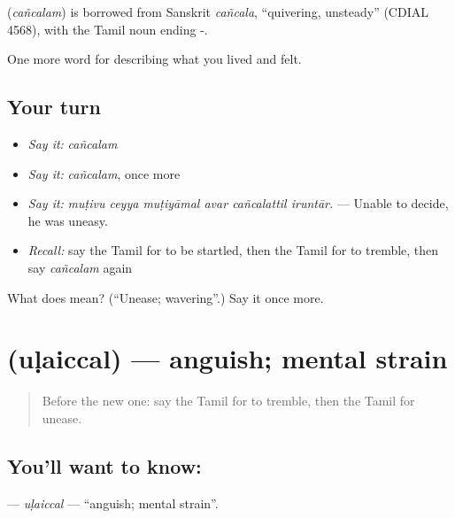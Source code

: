 \begin{cousinweb}
\textbf{} (\emph{cañcalam}) is borrowed from Sanskrit \emph{cañcala}, \textquotedblleft{}quivering, unsteady\textquotedblright{} (CDIAL 4568), with the Tamil noun ending -.
\end{cousinweb}

\begin{grammarlens}[title={What you've built}]
One more word for describing what you lived and felt.
\end{grammarlens}

\subsection*{Your turn}
\begin{itemize}
\raggedright
  \item \emph{Say it:} \emph{cañcalam}
  \item \emph{Say it:} \emph{cañcalam}, once more
  \item \emph{Say it:} \emph{muṭivu ceyya muṭiyāmal avar cañcalattil iruntār.} — Unable to decide, he was uneasy.
  \item \emph{Recall:} say the Tamil for to be startled, then the Tamil for to tremble, then say \emph{cañcalam} again
\end{itemize}

\begin{tcolorbox}[breakable,colback=teal!4,colframe=teal!35!black,title={Before you move on}]
What does  mean? (\textquotedblleft{}Unease; wavering\textquotedblright{}.) Say it once more.
\end{tcolorbox}
\section[\texorpdfstring{\ta{உளைச்சல்} (uḷaiccal)}{உளைச்சல் (uḷaiccal)}]{ (uḷaiccal) — anguish; mental strain}

\label{lesson:TA-C455-ulaiccal}



\begin{quote}
Before the new one: say the Tamil for to tremble, then the Tamil for unease.
\end{quote}

\subsection*{You'll want to know: }
\textbf{} — \emph{uḷaiccal} — \textquotedblleft{}anguish; mental strain\textquotedblright{}.

